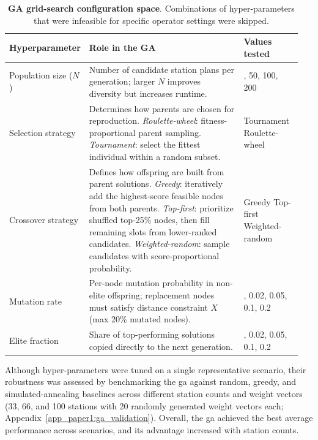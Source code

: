 \begin{table}[!htbp]
  \centering
  \caption{\textbf{GA grid-search configuration space}. Combinations of hyper-parameters that were infeasible for specific operator settings were skipped.}
  \label{table:ga_grid}
  \small
    \setlength{\tabcolsep}{5pt}
    \renewcommand{\arraystretch}{1.3}
    \begin{tabular}{>{\raggedright\arraybackslash}p{0.20\linewidth}>{\raggedright\arraybackslash}p{0.55\linewidth}>{\raggedright\arraybackslash}p{0.20\linewidth}}
    \toprule
    \textbf{Hyperparameter} & \textbf{Role in the GA} & \textbf{Values tested} \\
    \midrule
    Population size ($N$) & Number of candidate station plans per generation; larger $N$ improves diversity but increases runtime. & 25, 50, 100, 200 \\
    Selection strategy & Determines how parents are chosen for reproduction. \newline \textit{Roulette-wheel}: fitness-proportional parent sampling. \newline \textit{Tournament}: select the fittest individual within a random subset. & Tournament \newline Roulette-wheel \\
    Crossover strategy & Defines how offspring are built from parent solutions. \newline \textit{Greedy}: iteratively add the highest-score feasible nodes from both parents. \newline \textit{Top-first}: prioritize shuffled top-25\% nodes, then fill remaining slots from lower-ranked candidates. \newline \textit{Weighted-random}: sample candidates with score-proportional probability. & Greedy \newline Top-first \newline Weighted-random \\
    Mutation rate & Per-node mutation probability in non-elite offspring; replacement nodes must satisfy distance constraint $X$ (max 20\% mutated nodes). & 0.01, 0.02, 0.05, 0.1, 0.2 \\
    Elite fraction & Share of top-performing solutions copied directly to the next generation. & 0.01, 0.02, 0.05, 0.1, 0.2 \\
    \bottomrule
    \end{tabular}
\end{table}

Although hyper-parameters were tuned on a single representative scenario, their robustness was assessed by benchmarking the \ac{ga} against random, greedy, and simulated-annealing baselines across different station counts and weight vectors (33, 66, and 100 stations with 20 randomly generated weight vectors each; Appendix~\ref{app_paper1:ga_validation}). Overall, the \ac{ga} achieved the best average performance across scenarios, and its advantage increased with station counts.